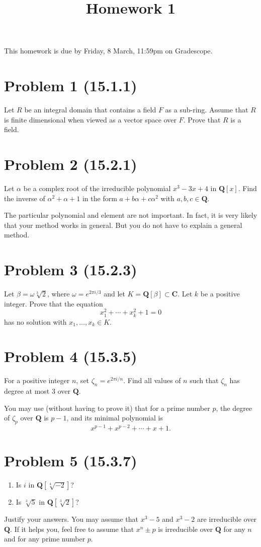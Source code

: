 \documentclass{amsart}
\date{}
\title{Homework 1}
\begin{document}
\maketitle
This homework is due by Friday, 8 March, 11:59pm on Gradescope.

\section{Problem 1 (15.1.1)}
\label{sec:org3322e24}
Let \(R\) be an integral domain that contains a field \(F\) as a sub-ring.
Assume that \(R\) is finite dimensional when viewed as a vector space over \(F\).
Prove that \(R\) is a field.

\section{Problem 2 (15.2.1)}
\label{sec:org010d260}
Let \(\alpha\) be a complex root of the irreducible polynomial \(x^{3}-3x+4\) in \(\mathbf{Q}[x]\).
Find the inverse of \(\alpha^2+\alpha+1\) in the form \(a + b \alpha + c \alpha^{2}\) with \(a, b, c \in \mathbf{Q}\).

The particular polynomial and element are not important.
In fact, it is very likely that your method works in general.
But you do not have to explain a general method.


\section{Problem 3 (15.2.3)}
\label{sec:org83de333}
Let \(\beta = \omega \sqrt[3]{2}\), where \(\omega = e^{2\pi i / 3}\) and let \(K = \mathbf{Q}[\beta] \subset \mathbf{C}\).
Let \(k\) be a positive integer.
Prove that the equation
\[ x_1^2 + \cdots + x_k^2 + 1 = 0\]
has no solution with \(x_1, \dots, x_{k} \in K\).


\section{Problem 4 (15.3.5)}
\label{sec:orgb50f637}
For a positive integer \(n\), set \(\zeta_{n} = e^{2\pi i / n}\).
Find all values of \(n\) such that \(\zeta_{n}\) has degree at most 3 over \(\mathbf{Q}\).

You may use (without having to prove it) that for a prime number \(p\), the degree of \(\zeta_p\) over \(\mathbf{Q}\) is \(p-1\), and its minimal polynomial is
\[x^{p-1}+ x^{p-2} + \cdots + x + 1.\]

\section{Problem 5 (15.3.7)}
\label{sec:orgc49491f}
\begin{enumerate}
\item Is \(i\) in \(\mathbf{Q}[\sqrt[4]{-2}]\)?
\item Is \(\sqrt[3]5\) in \(\mathbf{Q}[\sqrt[3]2]\)?
\end{enumerate}

Justify your answers.
You may assume that \(x^3-5\) and \(x^3-2\) are irreducible over \(\mathbf{Q}\).  
If it helps you, feel free to assume that \(x^n \pm p\) is irreducible over \(\mathbf{Q}\) for any \(n\) and for any prime number \(p\).
\end{document}

